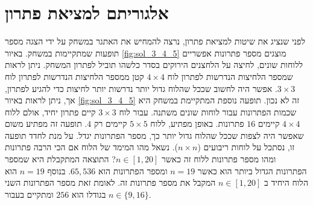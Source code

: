 \documentclass[12pt,leqno]{article}
\theoremstyle{theoremdd}
\begin{document}
\newpage

\section{אלגוריתם למציאת פתרון}
לפני שנציג את שיטות למציאת פתרון, נרצה להמחיש את 
האתגר במשחק על ידי הצגה מספר תופעות שמתקיימות במשחק.
באיור
\ref{fig:sol_3_4_5}
מוצגים מספר פתרונות אפשריים ללוחות שונים, לחיצה על הלחצנים הירוקים
בסדר כלשהו תוביל לפתרון המשחק.
ניתן לראות שמספר הלחיצות הנדרשות לפתרון לוח
$4 \times 4$
קטן ממספר הלחיצות הנדרשות לפתרון לוח
$3 \times 3$.
אפשר היה לחשוב שככל שהלוח גדול יותר נדרשות יותר לחיצות 
כדי להגיע לפתרון,
אך, ניתן לראות באיור
\ref{fig:sol_3_4_5}
זה לא נכון.
תופעה נוספת המתקיימת במשחק היא שכמות הפתרונות עבור לוחות שונים משתנה.
עבור לוח 
$3 \times 3$
קיים פתרון יחיד,
אולם ללוח 
$4 \times 4$
קיימים
$16$
פתרונות.
באופן מפתיע, ללוח 
$5 \times 5$
קיימים רק 
$4$.
תופעה זה מפתיע משום שאפשר היה לצפות שככל שהלוח גדול יותר
כך, מספר הפתרונות יגדל.
על מנת לחדד תופעה זו, נסתכל על לוחות ריבועים 
($n \times n$).
נשאל מהו המימד של הלוח אם הכי הרבה פתרונות ומהו מספר פתרונות ללוח זה כאשר
$n \in [1,20]$?
התוצאה המתקבלת היא שמספר הפתרונות הגדול ביותר הוא כאשר
$n = 19$ 
ומספר הפתרונות הוא
$65,536$.
בנוסף
$n = 19$ 
הוא הלוח היחיד ב
$n \in [1,20]$
המקבל את מספר פתרונות זה.
לאומת זאת
מספר הפתרונות השני בגודלו הוא
$256$
ומתקיים בעבור
$n \in \{9, 16 \}$.
\end{document}
